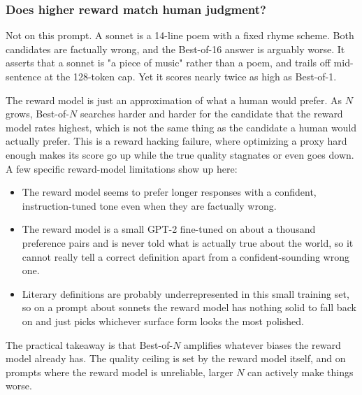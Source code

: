 \documentclass{article}
\begin{document}
\subsubsection*{Does higher reward match human judgment?}

Not on this prompt. A sonnet is a 14-line poem with a fixed rhyme scheme.
Both candidates are factually wrong, and the Best-of-16 answer is arguably
worse. It asserts that a sonnet is "a piece of music" rather than a
poem, and trails off mid-sentence at the 128-token cap. Yet it scores nearly
twice as high as Best-of-1.

The reward model is just an approximation of what a human would prefer.
As $N$ grows, Best-of-$N$ searches harder and harder for the candidate
that the reward model rates highest, which is not the same thing as the
candidate a human would actually prefer. This is a reward hacking
failure, where optimizing a proxy hard enough makes its score go up while
the true quality stagnates or even goes down. A few specific
reward-model limitations show up here:

\begin{itemize}
  \item The reward model seems to prefer longer
    responses with a confident, instruction-tuned tone even when they
    are factually wrong.
  \item The reward model is a small
    GPT-2 fine-tuned on about a thousand preference pairs and is never told
    what is actually true about the world, so it cannot really tell a
    correct definition apart from a confident-sounding wrong one.
  \item Literary definitions are probably
    underrepresented in this small training set, so on a prompt about
    sonnets the reward model has nothing solid to fall back on and just
    picks whichever surface form looks the most polished.
\end{itemize}

The practical takeaway is that Best-of-$N$ amplifies whatever biases the
reward model already has. The quality ceiling is set by the reward model
itself, and on prompts where the reward model is unreliable, larger $N$
can actively make things worse.
\end{document}
